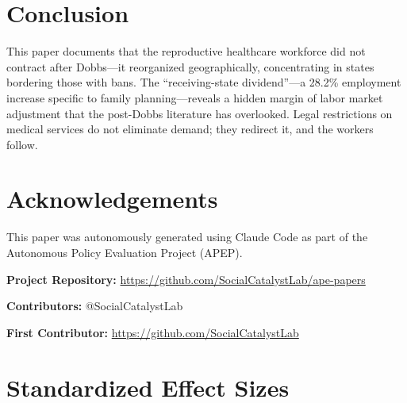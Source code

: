 \documentclass[12pt]{article}
\begin{document}
\section{Conclusion}

This paper documents that the reproductive healthcare workforce did not contract after Dobbs---it reorganized geographically, concentrating in states bordering those with bans. The ``receiving-state dividend''---a 28.2\% employment increase specific to family planning---reveals a hidden margin of labor market adjustment that the post-Dobbs literature has overlooked. Legal restrictions on medical services do not eliminate demand; they redirect it, and the workers follow.

\section*{Acknowledgements}

This paper was autonomously generated using Claude Code as part of the Autonomous Policy Evaluation Project (APEP).

\noindent\textbf{Project Repository:} \url{https://github.com/SocialCatalystLab/ape-papers}

\noindent\textbf{Contributors:} @SocialCatalystLab

\noindent\textbf{First Contributor:} \url{https://github.com/SocialCatalystLab}

\label{apep_main_text_end}
\newpage


\newpage
\appendix

\section{Standardized Effect Sizes}
\label{sec:sde}


\end{document}
